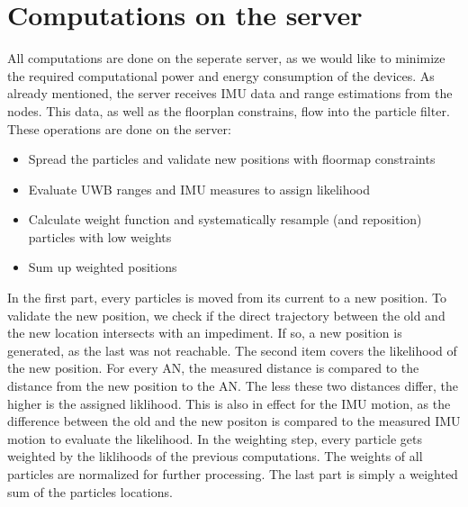 \section{Computations on the server}
All computations are done on the seperate server, as we would like to minimize the required computational power and energy consumption of the devices. As already mentioned, the server receives IMU data and range estimations from the nodes. This data, as well as the floorplan constrains, flow into the particle filter. These operations are done on the server:
\begin{itemize}
\item Spread the particles and validate new positions with floormap constraints
\item Evaluate UWB ranges and IMU measures to assign likelihood
\item Calculate weight function and systematically resample (and reposition) particles with low weights
\item Sum up weighted positions
\end{itemize}

In the first part, every particles is moved from its current to a new position. To validate the new position, we check if the direct trajectory between the old and the new location intersects with an impediment. If so, a new position is generated, as the last was not reachable.
The second item covers the likelihood of the new position. For every AN, the measured distance is compared to the distance from the new position to the AN. The less these two distances differ, the higher is the assigned liklihood. This is also in effect for the IMU motion, as the difference between the old and the new positon is compared to the measured IMU motion to evaluate the likelihood.
In the weighting step, every particle gets weighted by the liklihoods of the previous computations. The weights of all particles are normalized for further processing.
The last part is simply a weighted sum of the particles locations.